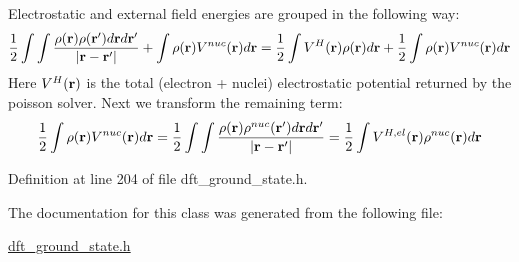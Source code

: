 Electrostatic and external field energies are grouped in the following way\+: \[ \frac{1}{2} \int \int \frac{\rho({\bf r})\rho({\bf r'}) d{\bf r} d{\bf r'}}{|{\bf r} - {\bf r'}|} + \int \rho({\bf r}) V^{nuc}({\bf r}) d{\bf r} = \frac{1}{2} \int V^{H}({\bf r})\rho({\bf r})d{\bf r} + \frac{1}{2} \int \rho({\bf r}) V^{nuc}({\bf r}) d{\bf r} \] Here $ V^{H}({\bf r}) $ is the total (electron + nuclei) electrostatic potential returned by the poisson solver. Next we transform the remaining term\+: \[ \frac{1}{2} \int \rho({\bf r}) V^{nuc}({\bf r}) d{\bf r} = \frac{1}{2} \int \int \frac{\rho({\bf r})\rho^{nuc}({\bf r'}) d{\bf r} d{\bf r'}}{|{\bf r} - {\bf r'}|} = \frac{1}{2} \int V^{H,el}({\bf r}) \rho^{nuc}({\bf r}) d{\bf r} \] 

Definition at line 204 of file dft\+\_\+ground\+\_\+state.\+h.



The documentation for this class was generated from the following file\+:\begin{DoxyCompactItemize}
\item 
\hyperlink{dft__ground__state_8h}{dft\+\_\+ground\+\_\+state.\+h}\end{DoxyCompactItemize}
